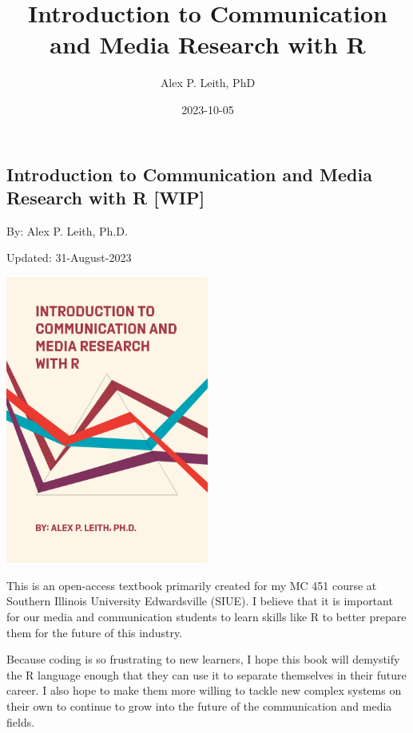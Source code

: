 \documentclass[
  b5paper]{book}
\title{Introduction to Communication and Media Research with R}
\author{Alex P. Leith, PhD}
\date{2023-10-05}
\begin{document}
\maketitle

{
\setcounter{tocdepth}{1}
\tableofcontents
}
\hypertarget{section}{%
\chapter*{}\label{section}}

\hypertarget{introduction-to-communication-and-media-research-with-r-wip}{%
\section*{Introduction to Communication and Media Research with R {[}WIP{]}}\label{introduction-to-communication-and-media-research-with-r-wip}}

By: Alex P. Leith, Ph.D.

Updated: 31-August-2023

\href{Current\%20Book\%20Cover\%20(Art\%20created\%20with\%20R\textquotesingle{}s\%20aRtsy\%20package)}{\includegraphics[width=0.5\textwidth,height=\textheight]{cover_2.png}}

This is an open-access textbook primarily created for my MC 451 course at Southern Illinois University Edwardsville (SIUE). I believe that it is important for our media and communication students to learn skills like R to better prepare them for the future of this industry.

Because coding is so frustrating to new learners, I hope this book will demystify the R language enough that they can use it to separate themselves in their future career. I also hope to make them more willing to tackle new complex systems on their own to continue to grow into the future of the communication and media fields.
\end{document}
